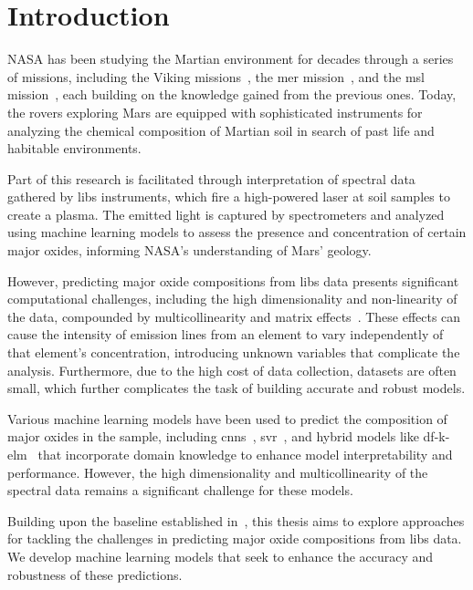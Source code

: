 \section{Introduction}\label{sec:introduction}
NASA has been studying the Martian environment for decades through a series of missions, including the Viking missions~\cite{marsnasagov_vikings}, the \gls{mer} mission~\cite{marsnasagov_observer, marsnasagov_spirit_opportunity}, and the \gls{msl} mission~\cite{marsnasagov_msl}, each building on the knowledge gained from the previous ones.
Today, the rovers exploring Mars are equipped with sophisticated instruments for analyzing the chemical composition of Martian soil in search of past life and habitable environments.

Part of this research is facilitated through interpretation of spectral data gathered by \gls{libs} instruments, which fire a high-powered laser at soil samples to create a plasma.
The emitted light is captured by spectrometers and analyzed using machine learning models to assess the presence and concentration of certain major oxides, informing NASA's understanding of Mars' geology.

However, predicting major oxide compositions from \gls{libs} data presents significant computational challenges, including the high dimensionality and non-linearity of the data, compounded by multicollinearity and matrix effects~\cite{andersonImprovedAccuracyQuantitative2017}. 
These effects can cause the intensity of emission lines from an element to vary independently of that element's concentration, introducing unknown variables that complicate the analysis. 
Furthermore, due to the high cost of data collection, datasets are often small, which further complicates the task of building accurate and robust models.

Various machine learning models have been used to predict the composition of major oxides in the sample, including \glspl{cnn}~\cite{yang_laser-induced_2022, yangConvolutionalNeuralNetwork2022}, \gls{svr}~\cite{rezaei_dimensionality_reduction}, and hybrid models like \gls{df}-\gls{k-elm}~\cite{song_DF-K-ELM} that incorporate domain knowledge to enhance model interpretability and performance.
However, the high dimensionality and multicollinearity of the spectral data remains a significant challenge for these models.

Building upon the baseline established in~\citet{p9_paper}, this thesis aims to explore approaches for tackling the challenges in predicting major oxide compositions from \gls{libs} data. We develop machine learning models that seek to enhance the accuracy and robustness of these predictions.

